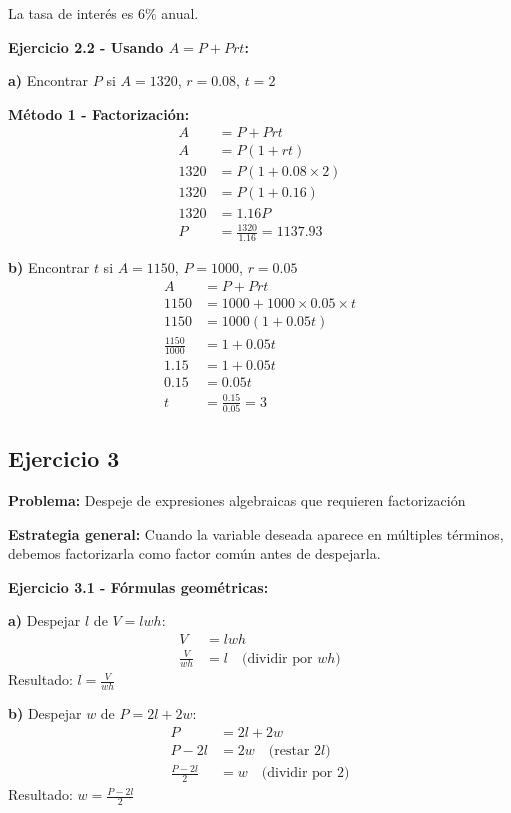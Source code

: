 La tasa de interés es $6\%$ anual.

\textbf{Ejercicio 2.2 - Usando $A = P + Prt$:}

\textbf{a)} Encontrar $P$ si $A = 1320$, $r = 0.08$, $t = 2$

\textbf{Método 1 - Factorización:}
\begin{align}
A &= P + Prt\\
A &= P(1 + rt)\\
1320 &= P(1 + 0.08 \times 2)\\
1320 &= P(1 + 0.16)\\
1320 &= 1.16P\\
P &= \frac{1320}{1.16} = 1137.93
\end{align}

\textbf{b)} Encontrar $t$ si $A = 1150$, $P = 1000$, $r = 0.05$
\begin{align}
A &= P + Prt\\
1150 &= 1000 + 1000 \times 0.05 \times t\\
1150 &= 1000(1 + 0.05t)\\
\frac{1150}{1000} &= 1 + 0.05t\\
1.15 &= 1 + 0.05t\\
0.15 &= 0.05t\\
t &= \frac{0.15}{0.05} = 3
\end{align}

\subsection*{Ejercicio 3}

\textbf{Problema:} Despeje de expresiones algebraicas que requieren factorización

\textbf{Estrategia general:} Cuando la variable deseada aparece en múltiples términos, debemos factorizarla como factor común antes de despejarla.

\textbf{Ejercicio 3.1 - Fórmulas geométricas:}

\textbf{a)} Despejar $l$ de $V = lwh$:
\begin{align}
V &= lwh\\
\frac{V}{wh} &= l \quad \text{(dividir por $wh$)}
\end{align}
Resultado: $l = \frac{V}{wh}$

\textbf{b)} Despejar $w$ de $P = 2l + 2w$:
\begin{align}
P &= 2l + 2w\\
P - 2l &= 2w \quad \text{(restar $2l$)}\\
\frac{P - 2l}{2} &= w \quad \text{(dividir por 2)}
\end{align}
Resultado: $w = \frac{P - 2l}{2}$

